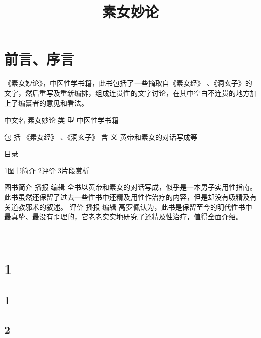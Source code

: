 \documentclass[12pt,UTF8]{ctexbook}
\title{\heiti\zihao{0} 素女妙论}
\author{}
\date{}
\begin{document}
\maketitle
\tableofcontents

\frontmatter
\chapter{前言、序言}

《素女妙论》，中医性学书籍，此书包括了一些摘取自《素女经》 、《洞玄子》的文字，然后重写及重新编排，组成连贯性的文字讨论，在其中空白不连贯的地方加上了编纂者的意见和看法。

中文名
素女妙论
类    型
中医性学书籍

包    括
《素女经》 、《洞玄子》
含    义
黄帝和素女的对话写成等

目录

1图书简介
2评价
3片段赏析

图书简介
播报
编辑
全书以黄帝和素女的对话写成，似乎是一本男子实用性指南。此书虽然还保留了过去一些性书中还精及用性作治疗的内容，但是却没有吸精及有关道教邪术的叙述。
评价
播报
编辑
高罗佩认为，此书是保留至今的明代性书中最真挚、最没有歪理的，它老老实实地研究了还精及性治疗，值得全面介绍。

\mainmatter

~\\

 \qquad  

\chapter{1}
\section{1}
\section{2}
\end{document}
